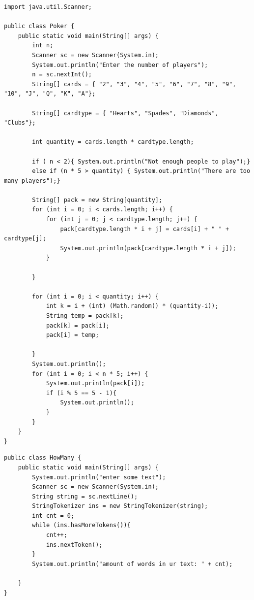 \documentclass[14pt, a4paper]{extarticle}
\newenvironment{code}{\captionsetup{type=listing}}{}
\begin{document}
\begin{code}
\begin{Verbatim}[frame=single, fontsize=\footnotesize]
import java.util.Scanner;

public class Poker {
    public static void main(String[] args) {
        int n;
        Scanner sc = new Scanner(System.in);
        System.out.println("Enter the number of players");
        n = sc.nextInt();
        String[] cards = { "2", "3", "4", "5", "6", "7", "8", "9", "10", "J", "Q", "K", "A"};

        String[] cardtype = { "Hearts", "Spades", "Diamonds", "Clubs"};

        int quantity = cards.length * cardtype.length;

        if ( n < 2){ System.out.println("Not enough people to play");}
        else if (n * 5 > quantity) { System.out.println("There are too many players");}

        String[] pack = new String[quantity];
        for (int i = 0; i < cards.length; i++) {
            for (int j = 0; j < cardtype.length; j++) {
                pack[cardtype.length * i + j] = cards[i] + " " + cardtype[j];
                System.out.println(pack[cardtype.length * i + j]);
            }

        }

        for (int i = 0; i < quantity; i++) {
            int k = i + (int) (Math.random() * (quantity-i));
            String temp = pack[k];
            pack[k] = pack[i];
            pack[i] = temp;

        }
        System.out.println();
        for (int i = 0; i < n * 5; i++) {
            System.out.println(pack[i]);
            if (i % 5 == 5 - 1){
                System.out.println();
            }
        }
    }
}
\end{Verbatim}
\end{code}

\begin{code}
\begin{Verbatim}[frame=single, fontsize=\footnotesize]
public class HowMany {
    public static void main(String[] args) {
        System.out.println("enter some text");
        Scanner sc = new Scanner(System.in);
        String string = sc.nextLine();
        StringTokenizer ins = new StringTokenizer(string);
        int cnt = 0;
        while (ins.hasMoreTokens()){
            cnt++;
            ins.nextToken();
        }
        System.out.println("amount of words in ur text: " + cnt);

    }
}
\end{Verbatim}
\end{code}
\end{document}

